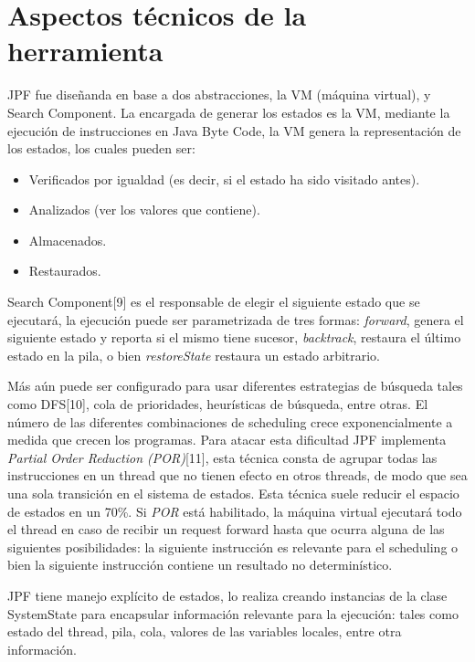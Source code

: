 \documentclass[runningheads]{llncs}
\begin{document}
\section{Aspectos t\'ecnicos de la herramienta}

JPF fue dise\~nanda en base a dos abstracciones, la VM (m\'aquina virtual), y Search Component.
La encargada de generar los estados es la VM, mediante la ejecuci\'on de instrucciones en Java Byte Code, la VM  genera la representaci\'on de los estados, los cuales pueden ser:

\begin{itemize}
\item Verificados por igualdad (es decir, si el estado ha sido visitado antes).
\item Analizados (ver los valores que contiene).
\item Almacenados.
\item Restaurados.
\end{itemize}

Search Component[9] es el responsable de elegir el siguiente estado que se ejecutar\'a, la ejecuci\'on puede ser parametrizada de tres formas: \textit{forward}, genera el siguiente estado y reporta si el mismo tiene sucesor, \textit{backtrack}, restaura el \'ultimo estado en la pila, o bien \textit{restoreState} restaura un estado arbitrario.

M\'as a\'un puede ser configurado para usar diferentes estrategias de b\'usqueda tales como DFS[10], cola de prioridades, heur\'isticas de b\'usqueda,  entre otras.
El n\'umero de las diferentes combinaciones de scheduling crece exponencialmente a medida que crecen los programas. Para atacar esta dificultad JPF implementa \textit{Partial Order Reduction (POR)}[11], esta t\'ecnica consta de agrupar todas las instrucciones en un thread que no tienen efecto en otros threads, de modo que sea una sola transici\'on en el sistema de estados. Esta t\'ecnica suele reducir el espacio de estados en un 70\%.
Si \textit{POR} est\'a habilitado, la máquina virtual ejecutar\'a todo el thread en caso de recibir un request forward hasta que ocurra alguna de las siguientes posibilidades: la siguiente instrucci\'on es relevante para el scheduling o bien la siguiente instrucci\'on contiene un resultado no determin\'istico.

JPF tiene manejo expl\'icito de estados, lo realiza creando instancias de la clase SystemState para encapsular informaci\'on relevante para la ejecuci\'on: tales como estado del thread, pila, cola, valores de las variables locales, entre otra informaci\'on.
\end{document}
